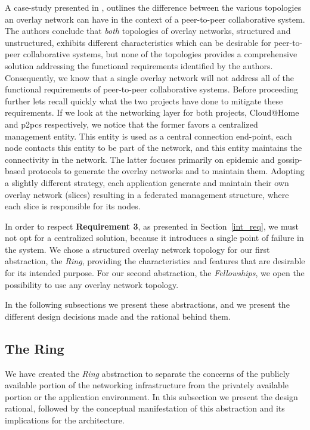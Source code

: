 \documentclass[12pt, titlepage]{uo_temp}
\begin{document}
     A case-study presented in \cite{p2p_collab}, outlines the difference between the
     various topologies an overlay network can have in the context of a peer-to-peer
     collaborative system. The authors conclude that \emph{both} topologies of overlay
     networks, structured and unstructured, exhibits different characteristics which can
     be desirable for peer-to-peer collaborative systems, but none of the topologies
     provides a comprehensive solution addressing the functional requirements identified
     by the authors. Consequently, we know that a single overlay network will not address
     all of the functional requirements of peer-to-peer collaborative systems. Before
     proceeding further lets recall quickly what the two projects have done to mitigate
     these requirements. If we look at the networking layer for both projects, Cloud@Home
     and \gls{p2pcs} respectively, we notice that the former favors a centralized
     management entity. This entity is used as a central connection end-point, each node
     contacts this entity to be part of the network, and this entity maintains the
     connectivity in the network. The latter focuses primarily on epidemic and
     gossip-based protocols to generate the overlay networks and to maintain
     them. Adopting a slightly different strategy, each application generate and maintain
     their own overlay network (slices) resulting in a federated management structure,
     where each slice is responsible for its nodes.

     In order to respect \textbf{Requirement 3}, as presented in Section~\ref{int_req}, we
     must not opt for a centralized solution, because it introduces a single point of
     failure in the system. We chose a structured overlay network topology for our first
     abstraction, the \emph{Ring}, providing the characteristics and features that are
     desirable for its intended purpose. For our second abstraction, the
     \emph{Fellowships}, we open the possibility to use any overlay network topology.
   
     In the following subsections we present these abstractions, and we present the
     different design decisions made and the rational behind them. 
     
     \subsection{The Ring}\label{arch_ring}
     We have created the \emph{Ring} abstraction to separate the concerns of the publicly
     available portion of the networking infrastructure from the privately available
     portion or the application environment. In this subsection we present the design
     rational, followed by the conceptual manifestation of this abstraction and its
     implications for the architecture.
\end{document}
